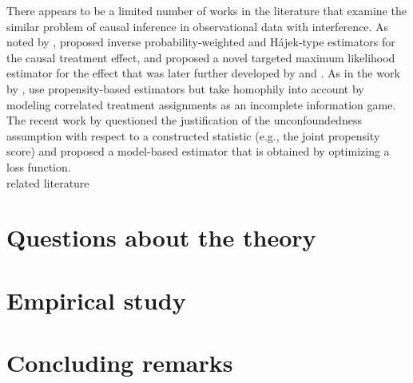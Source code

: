 \documentclass[10pt]{article}
\begin{document}
There appears to be a limited number of works in the literature that examine the similar problem of causal inference in observational data with interference. As noted by \citeauthor{Forastiere:2021}, \textcite{Liu:2016} proposed inverse probability-weighted and H\'{a}jek-type estimators for the causal treatment effect, and \textcite{VanDerLaan:2014} proposed a novel targeted maximum likelihood estimator for the effect that was later further developed by \textcite{Sofrygin:2017} and \textcite{Ogburn:2017}. As in the work by \citeauthor{Forastiere:2021}, \textcite{Jackson:2020} use propensity-based estimators but take homophily into account by modeling correlated treatment assignments as an incomplete information game. The recent work by \textcite{Sanchez:2021} questioned the justification of the unconfoundedness assumption with respect to a constructed statistic (e.g., the joint propensity score) and proposed a model-based estimator that is obtained by optimizing a loss function. \todo
\\

\todo related literature


\section{Questions about the theory}


\section{Empirical study}


\section{Concluding remarks}


\newpage


\printbibliography


\newpage


\appendix

\section{}
\end{document}
